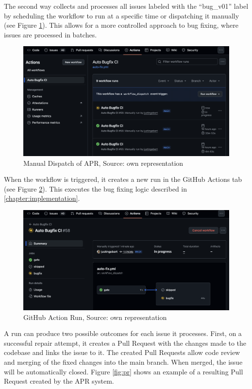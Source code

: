 The second way collects and processes all issues labeled with the ``bug\_v01'' label by scheduling the workflow to run at a specific time or dispatching it manually (see Figure \ref{fig:dispatch}). This allows for a more controlled approach to bug fixing, where issues are processed in batches.

\begin{figure}[H]
    \centering
    \includegraphics[width=1\textwidth]{images/workflow/manual_dispatch.png}
    \caption{Manual Dispatch of APR, Source: own representation}
    \label{fig:dispatch}
\end{figure}

When the workflow is triggered, it creates a new run in the GitHub Actions tab (see Figure \ref{fig:apr-action}). This executes the bug fixing logic described in \ref{chapter:implementation}.

\begin{figure}[H]
    \centering
    \includegraphics[width=1\textwidth]{images/workflow/new_action.png}
    \caption{GitHub Action Run, Source: own representation}
    \label{fig:apr-action}
\end{figure}

A run can produce two possible outcomes for each issue it processes. First, on a successful repair attempt, it creates a Pull Request with the changes made to the codebase and links the issue to it. The created Pull Requests allow code review and merging of the fixed changes into the main branch. When merged, the issue will be automatically closed. Figure \ref{fig:pr} shows an example of a resulting Pull Request created by the APR system.

